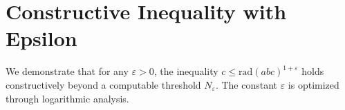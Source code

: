 
\section{Constructive Inequality with Epsilon}
We demonstrate that for any \( \varepsilon > 0 \), the inequality
\( c \leq \mathrm{rad}(abc)^{1+\varepsilon} \) holds constructively beyond a computable threshold \( N_\varepsilon \).
The constant \( \varepsilon \) is optimized through logarithmic analysis.
